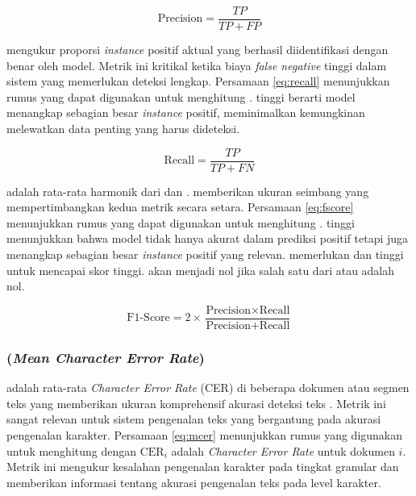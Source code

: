 \begin{equation}
    \label{eq:precision}
\text{Precision} = \frac{TP}{TP + FP}
\end{equation}

\recallfl{} mengukur proporsi \emph{instance} positif aktual yang berhasil diidentifikasi dengan benar oleh model. Metrik ini kritikal ketika biaya \emph{false negative} tinggi dalam sistem yang memerlukan deteksi lengkap. Persamaan \eqref{eq:recall} menunjukkan rumus yang dapat digunakan untuk menghitung \recall{} \parencite{jayaswal2020evalmetrics}.\recallfl{} tinggi berarti model menangkap sebagian besar \emph{instance} positif, meminimalkan kemungkinan melewatkan data penting yang harus dideteksi.

\begin{equation}
    \label{eq:recall}
\text{Recall} = \frac{TP}{TP + FN}
\end{equation}

\fscore{} adalah rata-rata harmonik dari \precision{} dan \recall{}. \fscore{} memberikan ukuran seimbang yang mempertimbangkan kedua metrik secara setara. Persamaan \eqref{eq:fscore} menunjukkan rumus yang dapat digunakan untuk menghitung \fscore{} \parencite{jayaswal2020evalmetrics}. \fscore{} tinggi menunjukkan bahwa model tidak hanya akurat dalam prediksi positif tetapi juga menangkap sebagian besar \emph{instance} positif yang relevan. \fscore{} memerlukan \precision{} dan \recall{} tinggi untuk mencapai skor tinggi. \fscore{} akan menjadi nol jika salah satu dari \precision{} atau \recall{} adalah nol.

\begin{equation}
    \label{eq:fscore}
\text{F1-Score} = 2 \times \frac{\text{Precision} \times \text{Recall}}{\text{Precision} + \text{Recall}}
\end{equation}

% 

\subsubsection{\mcer{} (\emph{Mean Character Error Rate})}

\mcer{} adalah rata-rata \emph{Character Error Rate} (CER) di beberapa dokumen atau segmen teks yang memberikan ukuran komprehensif akurasi deteksi teks \parencite{holley2009ocr}. Metrik ini sangat relevan untuk sistem pengenalan teks yang bergantung pada akurasi pengenalan karakter. Persamaan \eqref{eq:mcer} menunjukkan rumus yang digunakan untuk menghitung \mcer dengan $\text{CER}_i$ adalah \emph{Character Error Rate} untuk dokumen $i$. Metrik ini mengukur kesalahan pengenalan karakter pada tingkat granular dan memberikan informasi tentang akurasi pengenalan teks pada level karakter.

